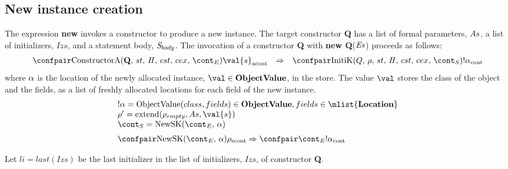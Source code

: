 \documentclass{article}
\DeclareMathOperator{\extend}{extend}
\begin{document}
\subsection{New instance creation}
\newcommand{\Initializer}[1]{\mathrm{Initializer}(#1)}
\newcommand{\SuperInitializer}[2]{\mathrm{SuperInitializer}(#1,\,#2)}
\newcommand{\RedirectingInitializer}[2]{\mathrm{RedirectingInitializer}(#1,\,#2)}

The expression \textbf{new} invokes a constructor to produce a new instance.
The target constructor \textbf{Q} has a list of formal parameters, $As$, a list of initializers, $Izs$, and a statement body, $\mathit{S}_{body}$.
The invocation of a constructor \textbf{Q} with \textbf{new Q}($\mathit{E}\mathit{s}$) proceeds as follows:
\[
  \begin{array}{lcl}
	\acontconf{\ConstructorA{\textbf{Q}}{\econt}}{\val{s}}
	& \Rightarrow &
	\contconf{\InitK{Q}{\env}{\scont}}{!\loc}
  \end{array}
\]
\noindent
where $\alpha$ is the location of the newly allocated instance, $\val \in \dobjval$, in the store.
The value $\val$ stores the class of the object and the fields, as a list of freshly allocated locations for each field of the new instance.
\[
  \begin{array}{l}
	\deref{\loc} = \objval \in \dobjval, fields \in \mlist{\dlocation}\\
	\env' = \extend(\env_{empty}, \formals, \val{s})\\
	\scont = \NewSK{\econt}{\loc} \\[2mm]

	\scontconf{\NewSK{\econt}{\loc}}{\env}
	\Rightarrow
	\contconf{\econt}{\deref{\loc}}
  \end{array}
\]

\noindent
Let $li = last(Izs)$ be the last initializer in the list of initializers, $Izs$, of constructor \textbf{Q}.
\end{document}
